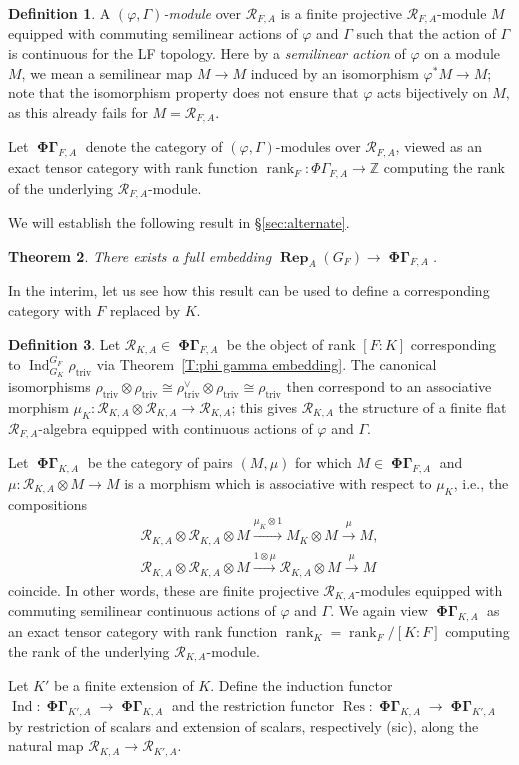 \documentclass[12pt]{amsart}
\newtheorem{theorem}{Theorem}[section]
\theoremstyle{definition}
\newtheorem{defn}[theorem]{Definition}
\numberwithin{equation}{theorem}
\newcommand{\ZZ}{\mathbb{Z}}
\newcommand{\calR}{\mathcal{R}}
\newcommand{\dual}{\vee}
\DeclareMathOperator{\Ind}{Ind}
\DeclareMathOperator{\PhiGamma}{\mathbf{\Phi \Gamma}}
\DeclareMathOperator{\rank}{rank}
\DeclareMathOperator{\Rep}{\mathbf{Rep}}
\DeclareMathOperator{\Res}{Res}
\DeclareMathOperator{\triv}{triv}
\begin{document}
\begin{defn}
A \emph{$(\varphi, \Gamma)$-module} over $\calR_{F,A}$ is a finite projective $\calR_{F,A}$-module $M$ equipped with commuting semilinear actions of $\varphi$ and $\Gamma$ such that the action of $\Gamma$ is continuous for the LF topology. Here by a \emph{semilinear action} of $\varphi$ on a module $M$, we mean a semilinear map $M \to M$ induced by an isomorphism $\varphi^* M \to M$; note that the isomorphism property does not ensure that $\varphi$ acts bijectively on $M$, as this already fails for $M = \calR_{F,A}$.

Let $\PhiGamma_{F,A}$ denote the category of $(\varphi, \Gamma)$-modules over $\calR_{F,A}$, viewed as an exact tensor category with rank function $\rank_F: \Phi\Gamma_{F,A} \to \ZZ$ computing the rank of the underlying $\calR_{F,A}$-module.
\end{defn}

We will establish the following result in \S\ref{sec:alternate}.
\begin{theorem} \label{T:phi gamma embedding1}
There exists a full embedding $\Rep_A(G_F) \to \PhiGamma_{F,A}$.
\end{theorem}
In the interim, let us see how this result can be used to define a corresponding category with $F$ replaced by $K$.

\begin{defn}
Let $\calR_{K,A} \in \PhiGamma_{F,A}$ be the object of rank $[F:K]$ corresponding to $\Ind^{G_F}_{G_K} \rho_{\triv}$ via Theorem~\ref{T:phi gamma embedding}. The canonical isomorphisms $\rho_{\triv} \otimes \rho_{\triv} \cong \rho_{\triv}^\dual \otimes \rho_{\triv} \cong \rho_{\triv}$
then correspond to an associative morphism $\mu_K: \calR_{K,A} \otimes \calR_{K,A} \to \calR_{K,A}$; this gives $\calR_{K,A}$ the structure of a finite flat $\calR_{F,A}$-algebra equipped with continuous actions of $\varphi$ and $\Gamma$.

Let $\PhiGamma_{K,A}$ be the category of pairs $(M, \mu)$ for which $M \in \PhiGamma_{F,A}$
and $\mu: \calR_{K,A} \otimes M \to M$ is a morphism which is associative with respect to $\mu_K$, i.e., the compositions
\begin{gather*}
\calR_{K,A} \otimes \calR_{K,A}  \otimes M \stackrel{\mu_K \otimes 1}{\to} M_K \otimes M \stackrel{\mu}{\to} M, \\
\calR_{K,A} \otimes \calR_{K,A} \otimes M \stackrel{1 \otimes \mu}{\to} \calR_{K,A} \otimes  M \stackrel{\mu}{\to} M
\end{gather*}
coincide. 
In other words, these are finite projective $\calR_{K,A}$-modules equipped with commuting semilinear continuous actions of $\varphi$ and $\Gamma$.
We again view $\PhiGamma_{K,A}$ as an exact tensor category with rank function $\rank_K = \rank_F / [K:F]$ computing the rank of the underlying $\calR_{K,A}$-module.

Let $K'$ be a finite extension of $K$. Define the induction functor
$\Ind: \PhiGamma_{K',A} \to \PhiGamma_{K,A}$ 
and the restriction functor $\Res: \PhiGamma_{K,A} \to \PhiGamma_{K',A}$
by restriction of scalars and extension of scalars, respectively (sic), along the natural map $\calR_{K,A}  \to \calR_{K',A}$.
\end{defn}
\end{document}
